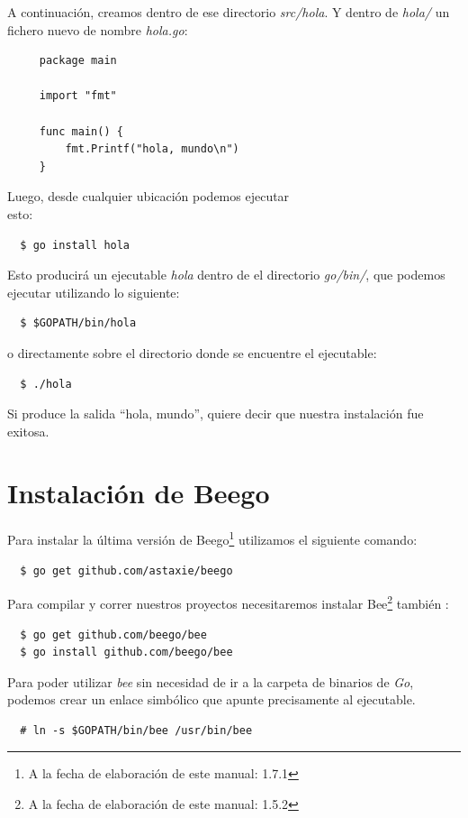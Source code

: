 \documentclass[12pt]{article}
\begin{document}
A continuación, creamos dentro de ese directorio  \textit{src/hola}.
Y dentro de \textit{hola/} un fichero nuevo de nombre \textit{hola.go}:
\begin{verbatim}
     package main

     import "fmt"

     func main() {
         fmt.Printf("hola, mundo\n")
     }
\end{verbatim}

Luego, desde cualquier ubicación podemos ejecutar\\
esto:
\begin{verbatim}
  $ go install hola
\end{verbatim}

Esto producirá un ejecutable \textit{hola} dentro de el directorio \textit{go/bin/},
que podemos ejecutar utilizando lo siguiente:
\begin{verbatim}
  $ $GOPATH/bin/hola
\end{verbatim}

o directamente sobre el directorio donde se encuentre el ejecutable:

\begin{verbatim}
  $ ./hola
\end{verbatim}

Si produce la salida ``hola, mundo'', quiere decir que nuestra instalación fue exitosa. \newpage


\section{Instalación de Beego}

\noindent Para instalar la última versión de Beego\footnote{A la fecha de elaboración de este manual: 1.7.1} utilizamos el siguiente comando:
\begin{verbatim}
  $ go get github.com/astaxie/beego
\end{verbatim}

\noindent Para compilar y correr nuestros proyectos necesitaremos instalar Bee\footnote{A la fecha de elaboración de este manual: 1.5.2} también :
\begin{verbatim}
  $ go get github.com/beego/bee
  $ go install github.com/beego/bee
\end{verbatim}

Para poder utilizar \textit{bee} sin necesidad de ir a la carpeta de binarios de \textit{Go}, podemos crear un enlace simbólico que apunte precisamente al ejecutable.
\begin{verbatim}
  # ln -s $GOPATH/bin/bee /usr/bin/bee
\end{verbatim}
\end{document}
